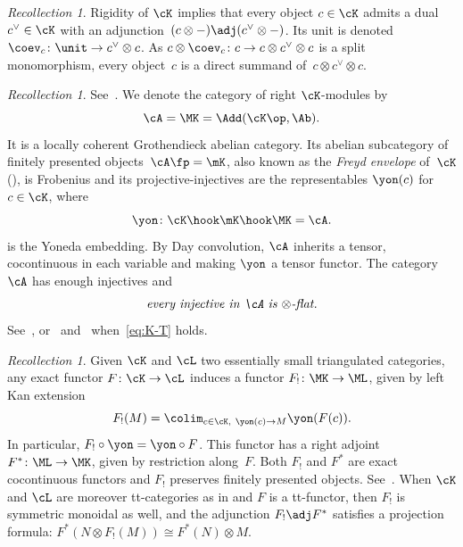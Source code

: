 \documentclass[11pt]{amsart}
\numberwithin{equation}{section} %
\theoremstyle{plain}
\theoremstyle{definition}
\theoremstyle{remark}
\newtheorem{rec}[equation]{Recollection}
\begin{document}
%
\begin{rec}
\label{rec:dual}%
Rigidity of $\cK$ implies that every object $c \in \cK$ admits a dual~$c^{\vee} \in \cK$ with an adjunction~$(c \otimes -) \adj ( c^{\vee}\otimes -)$. Its unit is denoted~$\coev_c\colon \unit \to c^{\vee} \otimes c$. As $c \otimes \coev_c \colon c \to c \otimes c^{\vee} \otimes c$ is a split monomorphism, every object~$c$ is a direct summand of~$c\otimes c^\vee\otimes c$.
\end{rec}

%
\begin{rec}
\label{rec:Yoneda}%
See~\cite[\S\,2]{BalmerKrauseStevenson19}.
We denote the category of right $\cK$-modules by
%
\[
\cA=\MK=\Add(\cK\op,\Ab).
\]
%
It is a locally coherent Grothendieck abelian category. Its abelian subcategory of finitely presented objects~$\cA\fp=\mK$, also known as the \emph{Freyd envelope} of~$\cK$ (\cite[Chapter~5]{Neeman01}), is Frobenius and its projective-injectives are the representables $\yon(c)$ for $c\in \cK$, where
%
\begin{equation*}
    \yon\colon \cK \hook \mK\hook \MK=\cA.
\end{equation*}
%
is the Yoneda embedding.
By Day convolution, $\cA$ inherits a tensor, cocontinuous in each variable and making $\yon$ a tensor functor. The category~$\cA$ has enough injectives and
%
\begin{equation}
\label{eq:inj=>flat}%
\textit{every injective in~$\cA$ is $\otimes$-flat.}
\end{equation}
%
See~\cite[\S2]{BirdWilliamson26}, or~\cite[Corollary~1.9]{Krause00} and~\cite[Proposition~A.14]{BalmerKrauseStevenson19} when~\eqref{eq:K-T} holds.
\end{rec}

%
\begin{rec}
\label{rec:F!-F*}%
Given $\cK$ and $\cL$ two essentially small triangulated categories, any exact functor $F \colon \cK \to \cL$ induces a functor $F_!\colon \MK \to \ML$, given by left Kan extension
%
\[
F_!(M) = \colim_{\substack{c\in\cK,\  \yon(c) \to M}} \yon(F(c)).
\]
In particular, $F_!\circ\yon = \yon\circ F$. This functor has a right adjoint $F^\ast \colon \ML \to \MK$, given by restriction along~$F$. Both $F_!$ and $F^{\ast}$ are exact cocontinuous functors and $F_!$ preserves finitely presented objects. See~\cite[\S 1]{Krause05}. When $\cK$ and $\cL$ are moreover tt-categories as in  and $F$ is a tt-functor, then $F_!$ is symmetric monoidal as well, and the adjunction $F_! \adj F^{\ast}$ satisfies a projection formula: $F^{\ast}(N \otimes F_!(M)) \cong F^{\ast}(N) \otimes M$. 
\end{rec}
\end{document}
